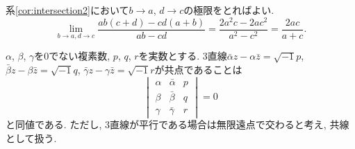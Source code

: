 \begin{prf*}
系\ref{cor:intersection2}において$b\to a$, $d\to c$の極限をとればよい.
\[\lim_{b\to a,d\to c}\frac{ab(c+d)-cd(a+b)}{ab-cd}=\frac{2a^2c-2ac^2}{a^2-c^2}=\frac{2ac}{a+c}.\]
\end{prf*}
%
%
\begin{bthm}\label{thm:concurrency0}
$\alpha$, $\beta$, $\gamma$を$0$でない複素数, $p$, $q$, $r$を実数とする.
$3$直線$\bar\alpha z-\alpha\bar z=\sqrt{-1}p$, $\bar\beta z-\beta\bar z=\sqrt{-1}q$, $\bar\gamma z-\gamma\bar z=\sqrt{-1}r$が共点であることは
\[
\begin{vmatrix}\alpha&\bar\alpha&p\\\beta&\bar\beta&q\\\gamma&\bar\gamma&r\end{vmatrix}=0
\]
と同値である.
ただし, $3$直線が平行である場合は無限遠点で交わると考え, 共線として扱う.
\end{bthm}
